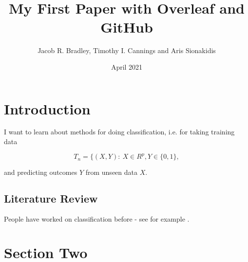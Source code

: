 \documentclass{article}
\title{My First Paper with Overleaf and GitHub}
\author{Jacob R. Bradley, Timothy I. Cannings and Aris Sionakidis}
\date{April 2021}
\begin{document}
\maketitle

\section{Introduction}
I want to learn about methods for doing classification, i.e. for taking training data 

\[ T_n = \{ (X,Y): \ X \in R^p, Y \in \{0,1\}, \]

and predicting outcomes $Y$ from unseen data $X$.

\subsection{Literature Review} 
People have worked on classification before - see for example \cite{cannings_random-projection_2017}.

\section{Section Two}



\end{document}
